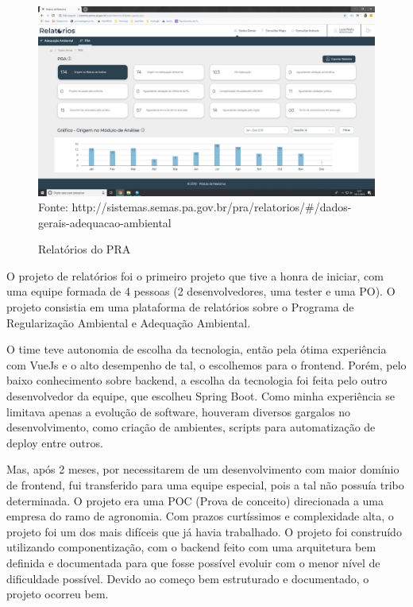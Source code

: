 \begin{figure}[H]
\centering
\caption{Relatórios do PRA} %
\includegraphics[scale=0.22]{relatorios-pra}\\  %
{\small Fonte: http://sistemas.semas.pa.gov.br/pra/relatorios/#/dados-gerais-adequacao-ambiental} %
\label{fig:exemplo} %
\end{figure}

O projeto de relatórios foi o primeiro projeto que tive a honra de iniciar, com uma equipe formada de 4 pessoas (2 desenvolvedores, uma tester e uma PO).
O projeto consistia em uma plataforma de relatórios sobre o Programa de Regularização Ambiental e Adequação Ambiental.

O time teve autonomia de escolha da tecnologia, então pela ótima experiência com VueJs e o alto desempenho de tal, o escolhemos para o frontend.
Porém, pelo baixo conhecimento sobre backend, a escolha da tecnologia foi feita pelo outro desenvolvedor da equipe, que escolheu Spring Boot.
Como minha experiência se limitava apenas a evolução de software, houveram diversos gargalos no desenvolvimento, como criação de ambientes, scripts para automatização de deploy entre outros.

Mas, após 2 meses, por necessitarem de um desenvolvimento com maior domínio de frontend, fui transferido para uma equipe especial, pois a tal não possuía tribo determinada.
O projeto era uma POC (Prova de conceito) direcionada a uma empresa do ramo de agronomia. Com prazos curtíssimos e complexidade alta, o projeto foi um dos mais difíceis que já havia trabalhado.
O projeto foi construído utilizando componentização, com o backend feito com uma arquitetura bem definida e documentada para que fosse possível evoluir com o menor nível de dificuldade possível. Devido ao começo bem estruturado e documentado, o projeto ocorreu bem.

